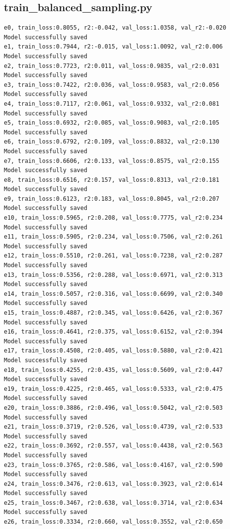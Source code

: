 \documentclass[a4paper, 12pt]{article}
\begin{document}
\subsection{train\_balanced\_sampling.py}	
\begin{lstlisting}
e0, train_loss:0.8055, r2:-0.042, val_loss:1.0358, val_r2:-0.020
Model successfully saved
e1, train_loss:0.7944, r2:-0.015, val_loss:1.0092, val_r2:0.006
Model successfully saved
e2, train_loss:0.7723, r2:0.011, val_loss:0.9835, val_r2:0.031
Model successfully saved
e3, train_loss:0.7422, r2:0.036, val_loss:0.9583, val_r2:0.056
Model successfully saved
e4, train_loss:0.7117, r2:0.061, val_loss:0.9332, val_r2:0.081
Model successfully saved
e5, train_loss:0.6932, r2:0.085, val_loss:0.9083, val_r2:0.105
Model successfully saved
e6, train_loss:0.6792, r2:0.109, val_loss:0.8832, val_r2:0.130
Model successfully saved
e7, train_loss:0.6606, r2:0.133, val_loss:0.8575, val_r2:0.155
Model successfully saved
e8, train_loss:0.6516, r2:0.157, val_loss:0.8313, val_r2:0.181
Model successfully saved
e9, train_loss:0.6123, r2:0.183, val_loss:0.8045, val_r2:0.207
Model successfully saved
e10, train_loss:0.5965, r2:0.208, val_loss:0.7775, val_r2:0.234
Model successfully saved
e11, train_loss:0.5905, r2:0.234, val_loss:0.7506, val_r2:0.261
Model successfully saved
e12, train_loss:0.5510, r2:0.261, val_loss:0.7238, val_r2:0.287
Model successfully saved
e13, train_loss:0.5356, r2:0.288, val_loss:0.6971, val_r2:0.313
Model successfully saved
e14, train_loss:0.5057, r2:0.316, val_loss:0.6699, val_r2:0.340
Model successfully saved
e15, train_loss:0.4887, r2:0.345, val_loss:0.6426, val_r2:0.367
Model successfully saved
e16, train_loss:0.4641, r2:0.375, val_loss:0.6152, val_r2:0.394
Model successfully saved
e17, train_loss:0.4508, r2:0.405, val_loss:0.5880, val_r2:0.421
Model successfully saved
e18, train_loss:0.4255, r2:0.435, val_loss:0.5609, val_r2:0.447
Model successfully saved
e19, train_loss:0.4225, r2:0.465, val_loss:0.5333, val_r2:0.475
Model successfully saved
e20, train_loss:0.3886, r2:0.496, val_loss:0.5042, val_r2:0.503
Model successfully saved
e21, train_loss:0.3719, r2:0.526, val_loss:0.4739, val_r2:0.533
Model successfully saved
e22, train_loss:0.3692, r2:0.557, val_loss:0.4438, val_r2:0.563
Model successfully saved
e23, train_loss:0.3765, r2:0.586, val_loss:0.4167, val_r2:0.590
Model successfully saved
e24, train_loss:0.3476, r2:0.613, val_loss:0.3923, val_r2:0.614
Model successfully saved
e25, train_loss:0.3467, r2:0.638, val_loss:0.3714, val_r2:0.634
Model successfully saved
e26, train_loss:0.3334, r2:0.660, val_loss:0.3552, val_r2:0.650

\end{lstlisting}
\end{document}
